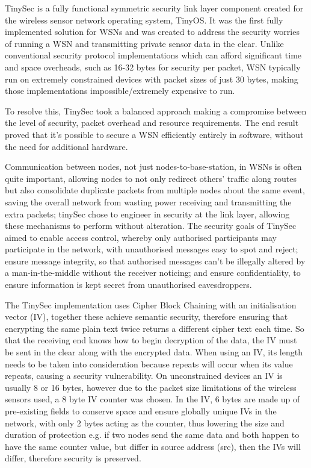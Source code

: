 TinySec is a fully functional symmetric security link layer component created for the wireless sensor network operating system, TinyOS. It was the first fully implemented solution for WSNs and was created to address the security worries of running a WSN and transmitting private sensor data in the clear. Unlike conventional security protocol implementations which can afford significant time and space overheads, such as 16-32 bytes for security per packet, WSN typically run on extremely constrained devices with packet sizes of just 30 bytes, making those implementations impossible/extremely expensive to run.

To resolve this, TinySec took a balanced approach making a compromise between the level of security, packet overhead and resource requirements. The end result proved that it's possible to secure a WSN efficiently entirely in software, without the need for additional hardware. 

Communication between nodes, not just nodes-to-base-station, in WSNs is often quite important, allowing nodes to not only redirect others' traffic along routes but also consolidate duplicate packets from multiple nodes about the same event, saving the overall network from wasting power receiving and transmitting the extra packets; tinySec chose to engineer in security at the link layer, allowing these mechanisms to perform without alteration. The security goals of TinySec aimed to enable access control, whereby only authorised participants may participate in the network, with unauthorised messages easy to spot and reject; ensure message integrity, so that authorised messages can't be illegally altered by a man-in-the-middle without the receiver noticing; and ensure confidentiality, to ensure information is kept secret from unauthorised eavesdroppers. 

The TinySec implementation uses Cipher Block Chaining with an initialisation vector (IV), together these achieve semantic security, therefore ensuring that encrypting the same plain text twice returns a different cipher text each time. So that the receiving end knows how to begin decryption of the data, the IV must be sent in the clear along with the encrypted data. When using an IV, its length needs to be taken into consideration because repeats will occur when its value repeats, causing a security vulnerability. On unconstrained devices an IV is usually 8 or 16 bytes, however due to the packet size limitations of the wireless sensors used, a 8 byte IV counter was chosen. In the IV, 6 bytes are made up of pre-existing fields to conserve space and ensure globally unique IVs in the network, with only 2 bytes acting as the counter, thus lowering the size and duration of protection e.g. if two nodes send the same data and both happen to have the same counter value, but differ in source address (src), then the IVs will differ, therefore security is preserved.

